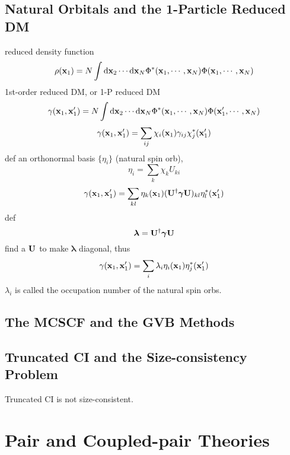 \documentclass[a4paper]{article}
\numberwithin{equation}{section}
\begin{document}
\subsection{Natural Orbitals and the 1-Particle Reduced DM}
reduced density function
\begin{equation}\label{key}
\rho(\vb{x}_1) = N\int \dd\vb{x}_2\cdots\dd\vb{x}_N \Phi^*(\vb{x}_1,\cdots,\vb{x}_N)\Phi(\vb{x}_1,\cdots,\vb{x}_N)
\end{equation}
1st-order reduced DM, or 1-P reduced DM
\begin{equation}\label{key}
\gamma(\vb{x}_1,\vb{x}'_1) = N\int \dd\vb{x}_2\cdots\dd\vb{x}_N \Phi^*(\vb{x}_1,\cdots,\vb{x}_N)\Phi(\vb{x}'_1,\cdots,\vb{x}_N)
\end{equation}
\begin{equation}\label{key}
\gamma(\vb{x}_1,\vb{x}'_1) = \sum_{ij} \chi_i(\vb{x}_1) \gamma_{ij} \chi_j^*(\vb{x}'_1)
\end{equation}
def an orthonormal basis $ \{\eta_i\} $ (natural spin orb), 
\begin{equation}\label{key}
\eta_i = \sum_k \chi_k U_{ki}
\end{equation}
\begin{equation}\label{key}
\gamma(\vb{x}_1,\vb{x}'_1) = \sum_{kl} \eta_k(\vb{x}_1) (\vb{U}^\dagger\bm\gamma\vb{U})_{kl} \eta_l^*(\vb{x}'_1)
\end{equation}
def 
\begin{equation}\label{key}
\bm\lambda = \vb{U}^\dagger\bm\gamma\vb{U}
\end{equation}
find a $ \vb{U} $ to make $ \bm\lambda $ diagonal, thus
\begin{equation}\label{key}
\gamma(\vb{x}_1,\vb{x}'_1) = \sum_{i} \lambda_i \eta_i(\vb{x}_1)  \eta_j^*(\vb{x}'_1)
\end{equation}
$ \lambda_i $ is called the occupation number of the natural spin orbs.

\subsection{The MCSCF and the GVB Methods}

\subsection{Truncated CI and the Size-consistency Problem}
Truncated CI is not size-consistent.

\section{Pair and Coupled-pair Theories}
\end{document}
